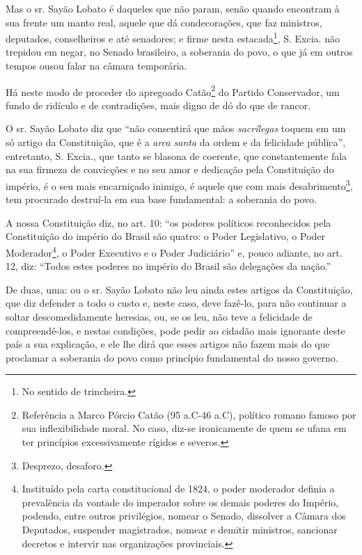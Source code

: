 Mas o sr. Sayão Lobato é daqueles que não param, senão quando encontram
à sua frente um manto real, aquele que dá condecorações, que faz
ministros, deputados, conselheiros e até senadores; e firme nesta
estacada\footnote{No sentido de trincheira.}, S. Excia. não trepidou
em negar, no Senado brasileiro, a soberania do povo, o que já em outros
tempos ousou falar na câmara temporária.

Há neste modo de proceder do apregoado Catão\footnote{Referência a
  Marco Pórcio Catão (95 a.C-46 a.C), político romano famoso por sua
  inflexibilidade moral. No caso, diz-se ironicamente de quem se ufana
  em ter princípios excessivamente rígidos e severos.} do Partido
Conservador, um fundo de ridículo e de contradições, mais digno de dó do
que de rancor.

O sr. Sayão Lobato diz que ``não consentirá que mãos \emph{sacrílegas}
toquem em um só artigo da Constituição, que é a \emph{arca santa} da
ordem e da felicidade pública'', entretanto, S. Excia., que tanto se
blasona de coerente, que constantemente fala na sua firmeza de
convicções e no seu amor e dedicação pela Constituição do império, é o
seu mais encarniçado inimigo, é aquele que com mais
desabrimento\footnote{Desprezo, desaforo.}, tem procurado destruí-la
em sua base fundamental: a soberania do povo.

A nossa Constituição diz, no art. 10: ``os poderes políticos reconhecidos
pela Constituição do império do Brasil são quatro: o Poder Legislativo,
o Poder Moderador\footnote{Instituído pela carta constitucional de
  1824, o poder moderador definia a prevalência da vontade do imperador
  sobre os demais poderes do Império, podendo, entre outros privilégios,
  nomear o Senado, dissolver a Câmara dos Deputados, suspender
  magistrados, nomear e demitir ministros, sancionar decretos e intervir
  nas organizações provinciais.}, o Poder Executivo e o Poder
Judiciário'' e, pouco adiante, no art. 12, diz: ``Todos estes poderes no
império do Brasil são delegações da nação.''

De duas, uma: ou o sr. Sayão Lobato não leu ainda estes artigos da
Constituição, que diz defender a todo o custo e, neste caso, deve
fazê-lo, para não continuar a soltar descomedidamente heresias, ou, se
os leu, não teve a felicidade de compreendê-los, e nestas condições,
pode pedir ao cidadão mais ignorante deste país a sua explicação, e ele
lhe dirá que esses artigos não fazem mais do que proclamar a soberania
do povo como princípio fundamental do nosso governo.

